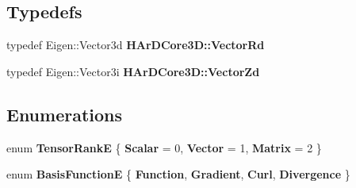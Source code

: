 \subsection*{Typedefs}
\begin{DoxyCompactItemize}
\item 
\mbox{\label{group__Basis_gafa49064b5221a119dd0271fb5f8ddbb1}} 
typedef Eigen\+::\+Vector3d {\bfseries H\+Ar\+D\+Core3\+D\+::\+Vector\+Rd}
\item 
\mbox{\label{group__Basis_gadeaa2d1c651a6a71697e40f9e8c9065b}} 
typedef Eigen\+::\+Vector3i {\bfseries H\+Ar\+D\+Core3\+D\+::\+Vector\+Zd}
\end{DoxyCompactItemize}
\subsection*{Enumerations}
\begin{DoxyCompactItemize}
\item 
\mbox{\label{group__Basis_ga81eb4732214b7560fbfa4ee9495c6da4}} 
enum {\bfseries Tensor\+RankE} \{ {\bfseries Scalar} = 0, 
{\bfseries Vector} = 1, 
{\bfseries Matrix} = 2
 \}
\item 
\mbox{\label{group__Basis_ga7be971bd231f83ec8d9cfd644a374180}} 
enum {\bfseries Basis\+FunctionE} \{ {\bfseries Function}, 
{\bfseries Gradient}, 
{\bfseries Curl}, 
{\bfseries Divergence}
 \}
\end{DoxyCompactItemize}
